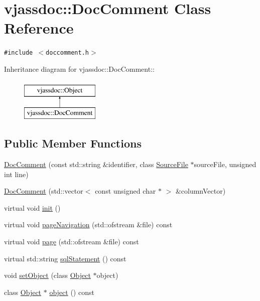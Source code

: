 \hypertarget{classvjassdoc_1_1DocComment}{
\section{vjassdoc::DocComment Class Reference}
\label{classvjassdoc_1_1DocComment}
}
{\tt \#include $<$doccomment.h$>$}

Inheritance diagram for vjassdoc::DocComment::\begin{figure}[H]
\begin{center}
\leavevmode
\includegraphics[height=2cm]{classvjassdoc_1_1DocComment}
\end{center}
\end{figure}
\subsection*{Public Member Functions}
\begin{CompactItemize}
\item 
\hyperlink{classvjassdoc_1_1DocComment_1a3724cee4e159efbac83c6c6e163301}{DocComment} (const std::string \&identifier, class \hyperlink{classvjassdoc_1_1SourceFile}{SourceFile} $\ast$sourceFile, unsigned int line)
\item 
\hyperlink{classvjassdoc_1_1DocComment_cc620c22e37f63571e20991a8f077ea3}{DocComment} (std::vector$<$ const unsigned char $\ast$ $>$ \&columnVector)
\item 
virtual void \hyperlink{classvjassdoc_1_1DocComment_46ada773166611c9be898f74e0eb2315}{init} ()
\item 
virtual void \hyperlink{classvjassdoc_1_1DocComment_2a0b017c17c8a20679b2052b87a74c15}{pageNavigation} (std::ofstream \&file) const 
\item 
virtual void \hyperlink{classvjassdoc_1_1DocComment_79dd94421713887af6028f49736d895d}{page} (std::ofstream \&file) const 
\item 
virtual std::string \hyperlink{classvjassdoc_1_1DocComment_d50177b6a9bd805ebe1ef76b8607242e}{sqlStatement} () const 
\item 
void \hyperlink{classvjassdoc_1_1DocComment_486dc09c43432be8e8285716aad13607}{setObject} (class \hyperlink{classvjassdoc_1_1Object}{Object} $\ast$object)
\item 
class \hyperlink{classvjassdoc_1_1Object}{Object} $\ast$ \hyperlink{classvjassdoc_1_1DocComment_057c80a5fd3a3c7d776483feaf51a8a8}{object} () const 
\end{CompactItemize}


